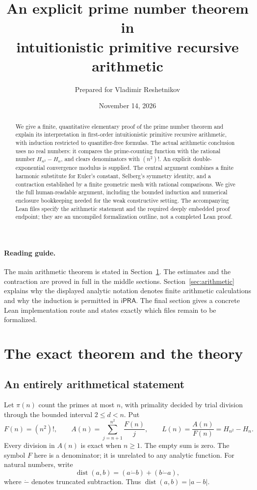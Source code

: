 \documentclass[11pt]{article}
\title{An explicit prime number theorem in\\
intuitionistic primitive recursive arithmetic}
\author{Prepared for Vladimir Reshetnikov}
\date{November 14, 2026}
\theoremstyle{definition}
\theoremstyle{remark}
\newcommand{\ipra}{\mathsf{iPRA}}
\newcommand{\dist}{\operatorname{dist}}
\newcommand{\dotminus}{\dot{-}}
\begin{document}
\maketitle
\begin{abstract}
We give a finite, quantitative elementary proof of the prime number theorem
and explain its interpretation in first-order intuitionistic primitive
recursive arithmetic, with induction restricted to quantifier-free formulas.
The actual arithmetic conclusion uses no real numbers: it compares the
prime-counting function with the rational number $H_{n^2}-H_n$, and clears
denominators with $(n^2)!$. An explicit double-exponential convergence modulus
is supplied. The central argument combines a finite harmonic substitute for
Euler's constant, Selberg's symmetry identity, and a contraction established
by a finite geometric mesh with rational comparisons. We give the full
human-readable argument, including the bounded induction and numerical
enclosure bookkeeping needed for the weak constructive setting. The
accompanying Lean files specify the arithmetic statement and the required
deeply embedded proof endpoint; they are an uncompiled formalization outline,
not a completed Lean proof.
\end{abstract}

\paragraph{Reading guide.}
The main arithmetic theorem is stated in Section~\ref{sec:statement}.
The estimates and the contraction are proved in full in the middle sections.
Section~\ref{sec:arithmetic} explains why the displayed analytic notation
denotes finite arithmetic calculations and why the induction is permitted in
$\ipra$. The final section gives a concrete Lean implementation route and
states exactly which files remain to be formalized.

\newpage
\tableofcontents
\newpage

\section{The exact theorem and the theory}\label{sec:statement}

\subsection{An entirely arithmetical statement}

Let $\pi(n)$ count the primes at most $n$, with primality decided by trial
division through the bounded interval $2\le d<n$. Put
\[
 F(n)=(n^2)!,\qquad
 A(n)=\sum_{j=n+1}^{n^2}\frac{F(n)}{j},\qquad
 L(n)=\frac{A(n)}{F(n)}=H_{n^2}-H_n.
\]
Every division in $A(n)$ is exact when $n\ge1$. The empty sum is zero.
The symbol $F$ here is a denominator; it is unrelated to any analytic
function. For natural numbers, write
\[
 \dist(a,b)=(a\mathbin{\dotminus}b)+(b\mathbin{\dotminus}a),
\]
where $\dotminus$ denotes truncated subtraction. Thus $\dist(a,b)=|a-b|$.
\end{document}
